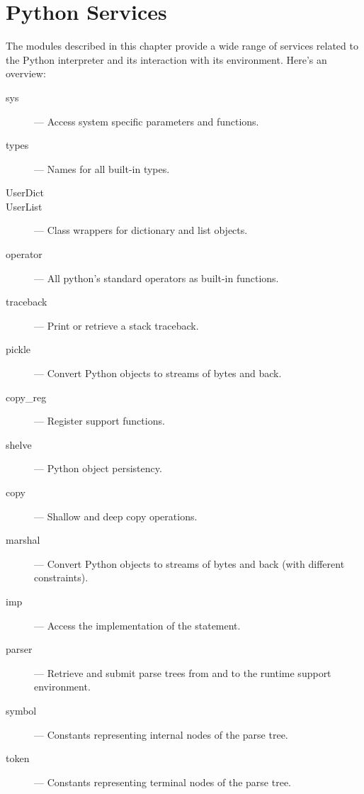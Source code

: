 \chapter{Python Services}
\label{python}

The modules described in this chapter provide a wide range of services
related to the Python interpreter and its interaction with its
environment.  Here's an overview:

\begin{description}

\item[sys]
--- Access system specific parameters and functions.

\item[types]
--- Names for all built-in types.

\item[UserDict]
\item[UserList]
--- Class wrappers for dictionary and list objects.

\item[operator]
--- All python's standard operators as built-in functions.

\item[traceback]
--- Print or retrieve a stack traceback.

\item[pickle]
--- Convert Python objects to streams of bytes and back.

\item[copy_reg]
--- Register  support functions.

\item[shelve]
--- Python object persistency.

\item[copy]
--- Shallow and deep copy operations.

\item[marshal]
--- Convert Python objects to streams of bytes and back (with
different constraints).

\item[imp]
--- Access the implementation of the  statement.

\item[parser]
--- Retrieve and submit parse trees from and to the runtime support
environment.

\item[symbol]
--- Constants representing internal nodes of the parse tree.

\item[token]
--- Constants representing terminal nodes of the parse tree.


\end{description}
